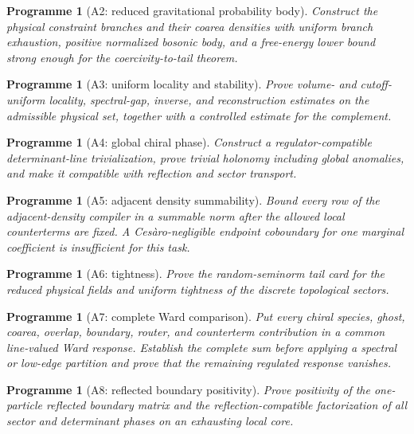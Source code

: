 \documentclass[11pt]{article}
\newtheorem{programme}[theorem]{Programme}
\begin{document}
\begin{programme}[A2: reduced gravitational probability body]
\label{prog:v11v1-a2}
Construct the physical constraint branches and their coarea densities with
uniform branch exhaustion, positive normalized bosonic body, and a
free-energy lower bound strong enough for the coercivity-to-tail theorem.
\end{programme}

\begin{programme}[A3: uniform locality and stability]
\label{prog:v11v1-a3}
Prove volume- and cutoff-uniform locality, spectral-gap, inverse, and
reconstruction estimates on the admissible physical set, together with a
controlled estimate for the complement.
\end{programme}

\begin{programme}[A4: global chiral phase]
\label{prog:v11v1-a4}
Construct a regulator-compatible determinant-line trivialization, prove
trivial holonomy including global anomalies, and make it compatible with
reflection and sector transport.
\end{programme}

\begin{programme}[A5: adjacent density summability]
\label{prog:v11v1-a5}
Bound every row of the adjacent-density compiler in a summable norm after
the allowed local counterterms are fixed.  A Ces\`aro-negligible endpoint
coboundary for one marginal coefficient is insufficient for this task.
\end{programme}

\begin{programme}[A6: tightness]
\label{prog:v11v1-a6}
Prove the random-seminorm tail card for the reduced physical fields and
uniform tightness of the discrete topological sectors.
\end{programme}

\begin{programme}[A7: complete Ward comparison]
\label{prog:v11v1-a7}
Put every chiral species, ghost, coarea, overlap, boundary, router, and
counterterm contribution in a common line-valued Ward response.  Establish
the complete sum before applying a spectral or low-edge partition and
prove that the remaining regulated response vanishes.
\end{programme}

\begin{programme}[A8: reflected boundary positivity]
\label{prog:v11v1-a8}
Prove positivity of the one-particle reflected boundary matrix and the
reflection-compatible factorization of all sector and determinant phases
on an exhausting local core.
\end{programme}
\end{document}
